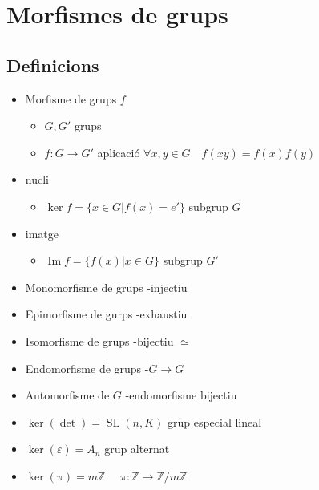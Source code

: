 \documentclass{article}
\DeclareMathOperator{\Ima}{Im}
\DeclareMathOperator{\SL}{SL}
\newcommand{\Z}{\mathbb{Z}}
\begin{document}
\section{Morfismes de grups}
\subsection{Definicions}
\begin{itemize}
\item Morfisme de grups $f$
	\begin{itemize}
	\item $G, G'$ grups
	\item $f:G\to G'$ aplicació
		\subitem $\forall x, y \in G\quad f(xy) = f(x)f(y)$
	\end{itemize}
\item nucli
	\begin{itemize}
	\item $\ker{f} = \{x \in G | f(x) = e'\}$ subgrup $G$
	\end{itemize}
\item imatge
	\begin{itemize}
	\item $\Ima{f} = \{f(x)| x \in G\}$ subgrup $G'$
	\end{itemize}
\item Monomorfisme de grups -injectiu
\item Epimorfisme de gurps -exhaustiu
\item Isomorfisme de grups -bijectiu $\simeq$
\item Endomorfisme de grups -$G \to G$
\item Automorfisme de $G$ -endomorfisme bijectiu

\item $\ker{(\det)} = \SL(n, K)$ grup especial lineal
\item $\ker{(\varepsilon)} = A_n$ grup alternat
\item $\ker{(\pi)} = m\Z$ $\quad \pi:\Z \to \Z/m\Z$
\end{itemize}
\end{document}
